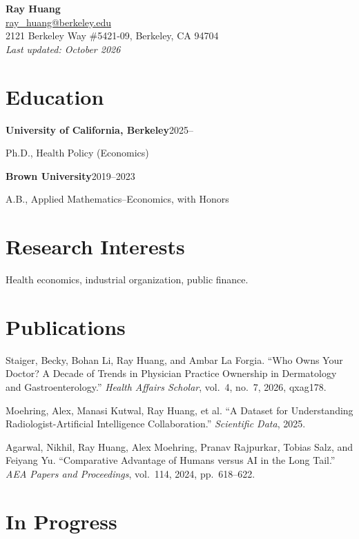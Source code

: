 \documentclass[11pt]{article}
\newcommand{\cvitem}[2]{\noindent\textbf{#1}\hfill #2\par}
\begin{document}
\begin{center}
  {\LARGE \textbf{Ray Huang}}\\[0.5em]
  \href{mailto:ray_huang@berkeley.edu}{ray\_huang@berkeley.edu} \\
  2121 Berkeley Way \#5421-09, Berkeley, CA 94704 \\
  \textit{Last updated: October 2026}
\end{center}

\section*{Education}

\cvitem{University of California, Berkeley}{2025--}
Ph.D., Health Policy (Economics)

\smallskip

\cvitem{Brown University}{2019--2023}
A.B., Applied Mathematics--Economics, with Honors

\section*{Research Interests}

Health economics, industrial organization, public finance.

\section*{Publications}

Staiger, Becky, Bohan Li, Ray Huang, and Ambar La Forgia.
``Who Owns Your Doctor? A Decade of Trends in Physician Practice Ownership in Dermatology and Gastroenterology.''
\textit{Health Affairs Scholar}, vol.~4, no.~7, 2026, qxag178.

\smallskip

Moehring, Alex, Manasi Kutwal, Ray Huang, et al.
``A Dataset for Understanding Radiologist-Artificial Intelligence Collaboration.''
\textit{Scientific Data}, 2025.

\smallskip

Agarwal, Nikhil, Ray Huang, Alex Moehring, Pranav Rajpurkar, Tobias Salz, and Feiyang Yu.
``Comparative Advantage of Humans versus AI in the Long Tail.''
\textit{AEA Papers and Proceedings}, vol.~114, 2024, pp.~618--622.

\section*{In Progress}
\end{document}
